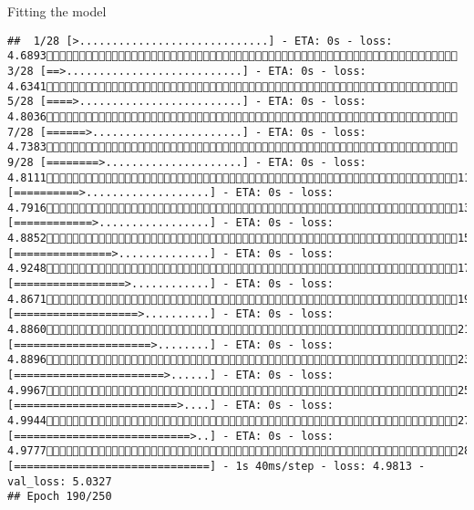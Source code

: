 \documentclass[
  ignorenonframetext,
]{beamer}
\begin{document}
\begin{frame}[fragile]{Fitting the model}
\begin{verbatim}
##  1/28 [>.............................] - ETA: 0s - loss: 4.6893 3/28 [==>...........................] - ETA: 0s - loss: 4.6341 5/28 [====>.........................] - ETA: 0s - loss: 4.8036 7/28 [======>.......................] - ETA: 0s - loss: 4.7383 9/28 [========>.....................] - ETA: 0s - loss: 4.811111/28 [==========>...................] - ETA: 0s - loss: 4.791613/28 [============>.................] - ETA: 0s - loss: 4.885215/28 [===============>..............] - ETA: 0s - loss: 4.924817/28 [=================>............] - ETA: 0s - loss: 4.867119/28 [===================>..........] - ETA: 0s - loss: 4.886021/28 [=====================>........] - ETA: 0s - loss: 4.889623/28 [=======================>......] - ETA: 0s - loss: 4.996725/28 [=========================>....] - ETA: 0s - loss: 4.994427/28 [===========================>..] - ETA: 0s - loss: 4.977728/28 [==============================] - 1s 40ms/step - loss: 4.9813 - val_loss: 5.0327
## Epoch 190/250

\end{verbatim}
\end{frame}
\end{document}
